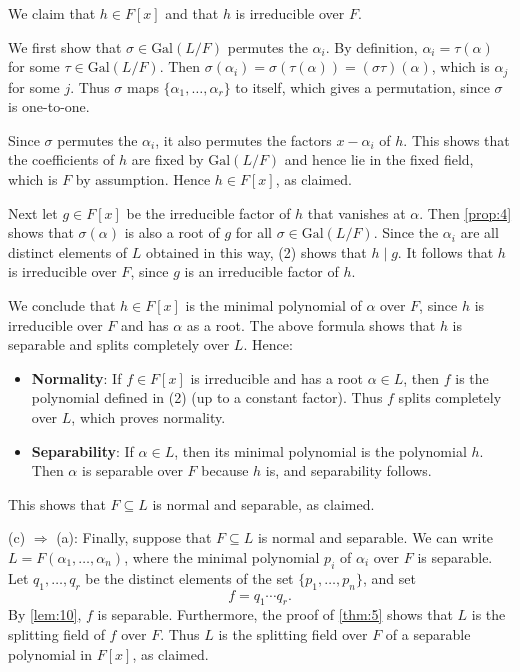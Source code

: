 \documentclass[leqno]{article}
\makeatletter
\theoremstyle{definition}
\theoremstyle{remark}
\let\oldproofname=\proofname
\renewcommand{\proofname}{\textit{\oldproofname}}
\theoremstyle{definition}
\renewenvironment{proof}[1][\proofname]{\par
  \pushQED{\qed}%
  \normalfont \topsep6\p@\@plus6\p@\relax
  \list{}{\leftmargin=0mm
          \rightmargin=0mm
          \settowidth{\itemindent}{\itshape#1}%
          \labelwidth=\itemindent
          \parsep=0pt \listparindent=0mm%
  }
  \item[\hskip\labelsep
        \itshape
    #1\@addpunct{.}]\ignorespaces
}{%
  \popQED\endlist\@endpefalse
}
\makeatother
\begin{document}
\begin{proof}
            We claim that $h\in F[x]$ and that $h$ is irreducible over $F$.\par\hspace{4mm} We first show that $\sigma\in\text{Gal}(L/F)$ permutes the $\alpha_i$. By definition, $\alpha_i=\tau(\alpha)$ for some $\tau\in\text{Gal}(L/F)$. Then $\sigma(\alpha_i)=\sigma(\tau(\alpha))=(\sigma\tau)(\alpha)$, which is $\alpha_j$ for some $j$. Thus $\sigma$ maps $\{\alpha_1,\dots,\alpha_r\}$ to itself, which gives a permutation, since $\sigma$ is one-to-one.\par\hspace{4mm} Since $\sigma$ permutes the $\alpha_i$, it also permutes the factors $x-\alpha_i$ of $h$. This shows that the coefficients of $h$ are fixed by $\text{Gal}(L/F)$ and hence lie in the fixed field, which is $F$ by assumption. Hence $h\in F[x]$, as claimed.\par\hspace{4mm} Next let $g\in F[x]$ be the irreducible factor of $h$ that vanishes at $\alpha$. Then \cref{prop:4} shows that $\sigma(\alpha)$ is also a root of $g$ for all $\sigma\in\text{Gal}(L/F)$. Since the $\alpha_i$ are all distinct elements of $L$ obtained in this way, (2) shows that $h\mid g$. It follows that $h$ is irreducible over $F$, since $g$ is an irreducible factor of $h$.\par\hspace{4mm} We conclude that $h\in F[x]$ is the minimal polynomial of $\alpha$ over $F$, since $h$ is irreducible over $F$ and has $\alpha$ as a root. The above formula shows that $h$ is separable and splits completely over $L$. Hence:
                \begin{itemize}
                    \item \textbf{Normality}: If $f\in F[x]$ is irreducible and has a root $\alpha\in L$, then $f$ is the polynomial defined in (2) (up to a constant factor). Thus $f$ splits completely over $L$, which proves normality.
                    \item \textbf{Separability}: If $\alpha\in L$, then its minimal polynomial is the polynomial $h$. Then $\alpha$ is separable over $F$ because $h$ is, and separability follows.
                \end{itemize}
            This shows that $F\subseteq L$ is normal and separable, as claimed.\par\hspace{4mm} (c) $\Rightarrow$ (a): Finally, suppose that $F\subseteq L$ is normal and separable. We can write $L=F(\alpha_1,\dots,\alpha_n)$, where the minimal polynomial $p_i$ of $\alpha_i$ over $F$ is separable. Let $q_1,\dots,q_r$ be the distinct elements of the set $\{p_1,\dots,p_n\}$, and set 
                \begin{equation*}
                    f=q_1\cdots q_r.
                \end{equation*}
            By \cref{lem:10}, $f$ is separable. Furthermore, the proof of \cref{thm:5} shows that $L$ is the splitting field of $f$ over $F$. Thus $L$ is the splitting field over $F$ of a separable polynomial in $F[x]$, as claimed.
        \end{proof}
\end{document}
